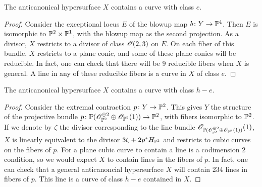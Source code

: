	\begin{claim}
		The anticanonical hypersurface $X$ contains a curve with class $e$.
	\end{claim}
	\begin{proof}
		Consider the exceptional locus $E$ of the blowup map $b \from Y \to \P^4$. Then $E$ is isomorphic to $\P^2 \times \P^1$, with the blowup map as the second projection. As a divisor, $X$ restricts to a divisor of class $\sO(2,3)$ on $E$. On each fiber of this bundle, $X$ restricts to a plane conic, and some of these plane conics will be reducible. In fact, one can check that there will be 9 reducible fibers when $X$ is general. A line in any of these reducible fibers is a curve in $X$ of class $e$.
	\end{proof}
	
	\begin{claim}
		The anticanonical hypersurface $X$ contains a curve with class $h-e$.
	\end{claim}
	\begin{proof}
		Consider the extremal contraction $p \from Y \to \P^2$. This gives $Y$ the structure of the projective bundle $p \from \P(\sO_{\P^2}^{\oplus 2} \oplus \sO_{\P^2}(1)) \to \P^2$, with fibers isomorphic to $\P^2$. If we denote by $\zeta$ the divisor corresponding to the line bundle $\sO_{\P(\sO_{\P^2}^{\oplus 2} \oplus \sO_{\P^2}(1))}(1)$,  $X$ is linearly equivalent to the divisor $3\zeta + 2p^*H_{\P^2}$ and restricts to cubic curves on the fibers of $p$. For a plane cubic curve to contain a line is a codimension 2 condition, so we would expect $X$ to contain lines in the fibers of $p$. In fact, one can check that a general anticanoncial hypersurface $X$ will contain 234 lines in fibers of $p$. This line is a curve of class $h-e$ contained in $X$.
	\end{proof}

\printbibliography[heading = subbibliography]
\stopcontents[chapters]
